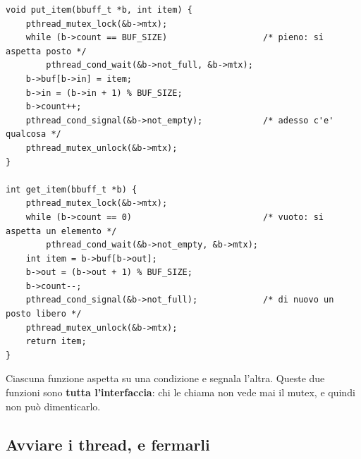 \begin{lstlisting}[language={[POSIX]C}, style=wnumbers, title={put\_item e get\_item}]
void put_item(bbuff_t *b, int item) {
    pthread_mutex_lock(&b->mtx);
    while (b->count == BUF_SIZE)                   /* pieno: si aspetta posto */
        pthread_cond_wait(&b->not_full, &b->mtx);
    b->buf[b->in] = item;
    b->in = (b->in + 1) % BUF_SIZE;
    b->count++;
    pthread_cond_signal(&b->not_empty);            /* adesso c'e' qualcosa */
    pthread_mutex_unlock(&b->mtx);
}

int get_item(bbuff_t *b) {
    pthread_mutex_lock(&b->mtx);
    while (b->count == 0)                          /* vuoto: si aspetta un elemento */
        pthread_cond_wait(&b->not_empty, &b->mtx);
    int item = b->buf[b->out];
    b->out = (b->out + 1) % BUF_SIZE;
    b->count--;
    pthread_cond_signal(&b->not_full);             /* di nuovo un posto libero */
    pthread_mutex_unlock(&b->mtx);
    return item;
}
\end{lstlisting}

Ciascuna funzione aspetta su una condizione e segnala l'altra. Queste due funzioni sono \textbf{tutta l'interfaccia}: chi
le chiama non vede mai il mutex, e quindi non può dimenticarlo.


\subsection{Avviare i thread, e fermarli}


